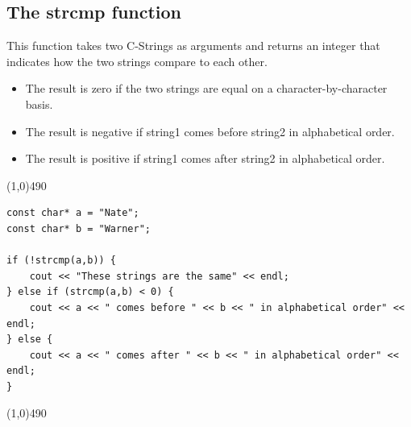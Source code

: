 \documentclass{report}
\begin{document}
    \pagebreak \bigbreak \noindent 
    \subsection{The strcmp function}
    \bigbreak \noindent 
    This function takes two C-Strings as arguments and returns an integer that indicates how the two strings compare to each other. 
    \begin{itemize}
        \item The result is zero if the two strings are equal on a character-by-character basis.
        \item The result is negative if string1 comes before string2 in alphabetical order.
        \item The result is positive if string1 comes after string2 in alphabetical order.
    \end{itemize}
    \bigbreak \noindent 
    \line(1,0){490}
    \begin{verbatim}
const char* a = "Nate";
const char* b = "Warner";

if (!strcmp(a,b)) {
    cout << "These strings are the same" << endl;
} else if (strcmp(a,b) < 0) {
    cout << a << " comes before " << b << " in alphabetical order" << endl;
} else {
    cout << a << " comes after " << b << " in alphabetical order" << endl;
}
    \end{verbatim}
    \line(1,0){490}

    \bigbreak \noindent 
\end{document}
